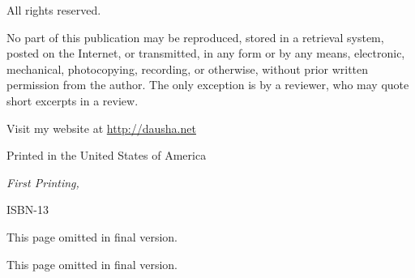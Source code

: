   \par\noindent All rights reserved.\newline

  \par\noindent No part of this publication may be reproduced, stored in a retrieval system, posted on the Internet, or transmitted, in any form or by any means, electronic, mechanical, photocopying, recording, or otherwise, without prior written permission from the author. The only exception is by a reviewer, who may quote short excerpts in a review.\newline

  \par\noindent \theauthor
  \par\noindent Visit my website at \url{http://dausha.net}\newline

  \par\noindent Printed in the United States of America
  \newline

  \par\noindent\textit{First Printing, \usmonthyear{}}
  \newline
  
  \par\noindent ISBN-13 \isbn
  \vspace*{\fill}
  \newpage

%
\ifdefined\isfinal
\else
  
  This page omitted in final version.
  
  \listoftodos
  \newpage
  This page omitted in final version.
  \tableofcontents
  \newpage
\fi

